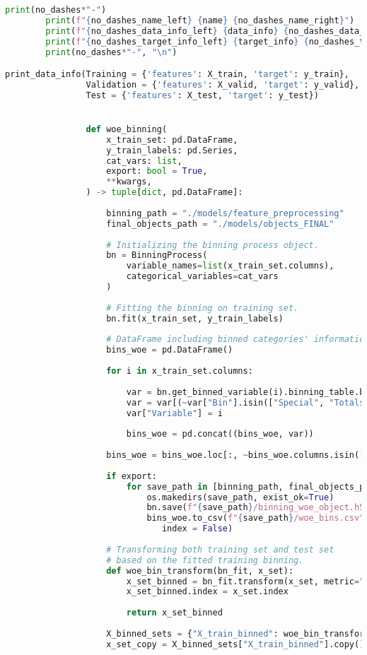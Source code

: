 \begin{lstlisting}[language=Python, basicstyle=\footnotesize\ttfamily]
        print(no_dashes*"-")
        print(f"{no_dashes_name_left} {name} {no_dashes_name_right}")
        print(f"{no_dashes_data_info_left} {data_info} {no_dashes_data_info_right}")
        print(f"{no_dashes_target_info_left} {target_info} {no_dashes_target_info_right}")
        print(no_dashes*"-", "\n")

print_data_info(Training = {'features': X_train, 'target': y_train},
                Validation = {'features': X_valid, 'target': y_valid},
                Test = {'features': X_test, 'target': y_test})


				def woe_binning(
					x_train_set: pd.DataFrame,
					y_train_labels: pd.Series,
					cat_vars: list,
					export: bool = True,
					**kwargs,
				) -> tuple[dict, pd.DataFrame]:
				
					binning_path = "./models/feature_preprocessing"
					final_objects_path = "./models/objects_FINAL"
				
					# Initializing the binning process object.
					bn = BinningProcess(
						variable_names=list(x_train_set.columns),
						categorical_variables=cat_vars
					)
				
					# Fitting the binning on training set.
					bn.fit(x_train_set, y_train_labels)
				
					# DataFrame including binned categories' information.
					bins_woe = pd.DataFrame()
				
					for i in x_train_set.columns:
				
						var = bn.get_binned_variable(i).binning_table.build()
						var = var[(~var["Bin"].isin(["Special", "Totals"]))]
						var["Variable"] = i
				
						bins_woe = pd.concat((bins_woe, var))
				
					bins_woe = bins_woe.loc[:, ~bins_woe.columns.isin(["JS"])]
				
					if export:
						for save_path in [binning_path, final_objects_path]:
							os.makedirs(save_path, exist_ok=True)
							bn.save(f"{save_path}/binning_woe_object.h5")
							bins_woe.to_csv(f"{save_path}/woe_bins.csv",
							   index = False)
				
					# Transforming both training set and test set
					# based on the fitted training binning.
					def woe_bin_transform(bn_fit, x_set):
						x_set_binned = bn_fit.transform(x_set, metric="woe")
						x_set_binned.index = x_set.index
				
						return x_set_binned
				
					X_binned_sets = {"X_train_binned": woe_bin_transform(bn, x_train_set)}
					x_set_copy = X_binned_sets["X_train_binned"].copy()
				

\end{lstlisting}
